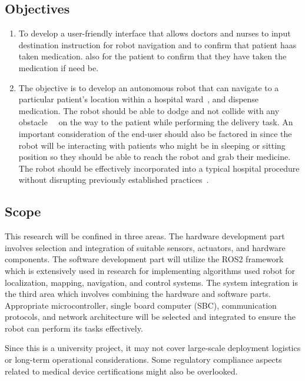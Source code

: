 \subsection{Objectives}
\begin{enumerate}
    \item To develop a user-friendly interface that allows doctors and nurses to input destination instruction for robot navigation and to confirm that patient haas taken medication.  also for the patient to confirm that they have taken the medication if need be. 
    \item The objective is to develop an autonomous robot that can navigate to a particular patient's location within a hospital ward~\cite{helpmate}, and dispense medication. The robot should be able to dodge and not collide with any obstacle~\cite{laserbased_zheng}~\cite{kruse2013human} on the way to the patient while performing the delivery task. An important consideration of the end-user should also be factored in since the robot will be interacting with patients who might be in sleeping or sitting position so they should be able to reach the robot and grab their medicine. The robot should be effectively incorporated into a typical hospital procedure without disrupting previously established practices~\cite{ahn2019hospital}. 
\end{enumerate}


\subsection{Scope}
This research will be confined in three areas. The hardware development part involves selection
and integration of suitable sensors, actuators, and hardware components. The software development part will
utilize the ROS2 framework which is extensively used in research for implementing algorithms used robot for
localization, mapping, navigation, and control systems. The system integration is
the third area which involves combining the hardware and software parts.
Appropriate microcontroller, single board computer (SBC), communication protocols, and
network architecture will be selected and integrated to ensure the robot can perform its tasks effectively.
\begin{comment}Multiple tests and experiments will be conducted to evaluate the solution being developed. The
robot will be tested in a simulated environment to assess the suitability of the solutions implemented. \end{comment}
Since this is a university project, it may not cover large-scale
deployment logistics or long-term operational considerations. Some regulatory compliance aspects related to
medical device certifications might also be overlooked.


